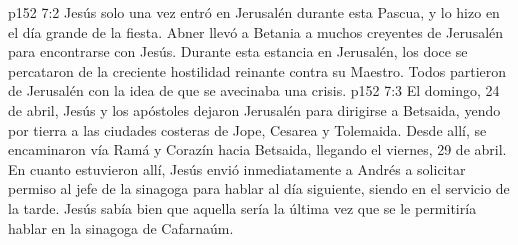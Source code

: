 \vs p152 7:2 Jesús solo una vez entró en Jerusalén durante esta Pascua, y lo hizo en el día grande de la fiesta. Abner llevó a Betania a muchos creyentes de Jerusalén para encontrarse con Jesús. Durante esta estancia en Jerusalén, los doce se percataron de la creciente hostilidad reinante contra su Maestro. Todos partieron de Jerusalén con la idea de que se avecinaba una crisis.
\vs p152 7:3 El domingo, 24 de abril, Jesús y los apóstoles dejaron Jerusalén para dirigirse a Betsaida, yendo por tierra a las ciudades costeras de Jope, Cesarea y Tolemaida. Desde allí, se encaminaron vía Ramá y Corazín hacia Betsaida, llegando el viernes, 29 de abril. En cuanto estuvieron allí, Jesús envió inmediatamente a Andrés a solicitar permiso al jefe de la sinagoga para hablar al día siguiente, siendo  en el servicio de la tarde. Jesús sabía bien que aquella sería la última vez que se le permitiría hablar en la sinagoga de Cafarnaúm.
